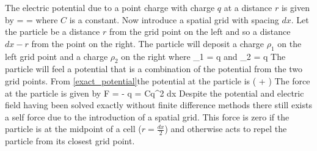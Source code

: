 The electric potential due to a point charge with charge $q$ at a distance $r$ is given by 
\be 
\psi =   = 
\label{exact_potential}
\ee 
where $C$ is a constant. Now introduce a spatial grid with spacing $dx$. Let the particle be a distance $r$ from the grid point on the left and so a distance $dx - r$ from the point on the right. The particle will deposit a charge $\rho_1$ on the left grid point and a charge $\rho_2$ on the right where
\be 
\rho_1 = q
\ee 
and
\be 
\rho_2 = q
\ee 
The particle will feel a potential that is a combination of the potential from the two grid points. From \eqref{exact_potential}the potential at the particle is 
\be 
{} \left( +  \right) 
\ee 
The force at the particle is given by 
\be 
F = - q = Cq^2 dx
\ee 
Despite the potential and electric field having been solved exactly without finite difference methods there still exists a self force due to the introduction of a spatial grid. This force is zero if the particle is at the midpoint of a cell ($r=\frac{dx}{2}$) and otherwise acts to repel the particle from its closest grid point.

